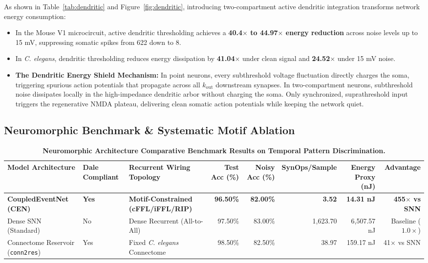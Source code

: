 \documentclass[10pt,twocolumn,letterpaper]{article}
\begin{document}
As shown in Table~\ref{tab:dendritic} and Figure~\ref{fig:dendritic}, introducing two-compartment active dendritic integration transforms network energy consumption:
\begin{itemize}[leftmargin=*]
    \item In the Mouse V1 microcircuit, active dendritic thresholding achieves a \textbf{40.4$\times$ to 44.97$\times$ energy reduction} across noise levels up to 15 mV, suppressing somatic spikes from 622 down to 8.
    \item In \textit{C. elegans}, dendritic thresholding reduces energy dissipation by \textbf{41.04$\times$} under clean signal and \textbf{24.52$\times$} under 15 mV noise.
    \item \textbf{The Dendritic Energy Shield Mechanism:} In point neurons, every subthreshold voltage fluctuation directly charges the soma, triggering spurious action potentials that propagate across all $k_{\mathrm{out}}$ downstream synapses. In two-compartment neurons, subthreshold noise dissipates locally in the high-impedance dendritic arbor without charging the soma. Only synchronized, suprathreshold input triggers the regenerative NMDA plateau, delivering clean somatic action potentials while keeping the network quiet.
\end{itemize}

\subsection{Neuromorphic Benchmark \& Systematic Motif Ablation}

\begin{table}[t]
\centering
\small
\caption{\textbf{Neuromorphic Architecture Comparative Benchmark Results on Temporal Pattern Discrimination.}}
\label{tab:benchmark}
\begin{tabular}{lllrrrrr}
\toprule
\textbf{Model Architecture} & \textbf{Dale Compliant} & \textbf{Recurrent Wiring Topology} & \textbf{Test Acc (\%)} & \textbf{Noisy Acc (\%)} & \textbf{SynOps/Sample} & \textbf{Energy Proxy (nJ)} & \textbf{Advantage} \\
\midrule
\textbf{CoupledEventNet (CEN)} & \textbf{Yes} & \textbf{Motif-Constrained (cFFL/iFFL/RIP)} & \textbf{96.50\%} & \textbf{82.00\%} & \textbf{3.52} & \textbf{14.31 nJ} & \textbf{455$\times$ vs SNN} \\
Dense SNN (Standard) & No & Dense Recurrent (All-to-All) & 97.50\% & 83.00\% & 1,623.70 & 6,507.57 nJ & Baseline ($1.0\times$) \\
Connectome Reservoir (\texttt{conn2res}) & Yes & Fixed \textit{C. elegans} Connectome & 98.50\% & 82.50\% & 38.97 & 159.17 nJ & 41$\times$ vs SNN \\
\bottomrule
\end{tabular}
\end{table}
\end{document}

